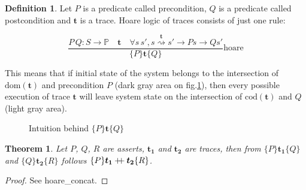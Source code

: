 \documentclass[10pt,letterpaper]{article}
\newcommand \prop{\mathds{P}}
\newcommand \dom[1]{\text{dom}\left(#1\right)}
\newcommand \cod[1]{\text{cod}\left(#1\right)}
\newcommand \chain[3]{\mathrel{#1\stackrel{#3}{\rightsquigarrow}#2}}
\newcommand \bm[1]{\boldsymbol{#1}}
\newcommand \mdoubleplus{\mathbin{+\mkern-6mu+}}
\newtheorem{theorem}{Theorem}
\theoremstyle{definition}
\newtheorem{definition}{Definition}
\begin{document}
\begin{definition}
  Let $P$ is a predicate called precondition, $Q$ is a predicate
  called postcondition and $\bm{t}$ is a trace. Hoare logic of traces
  consists of just one rule:

  \begin{equation}
    \frac{P\, Q: S \to \prop \quad \bm{t} \quad \forall s\,s', \chain{s}{s'}{\bm{t}} \to P s \to Q s'}
         {\{P\} \bm{t} \{Q\}}
    \text{hoare}
  \end{equation}

  This means that if initial state of the system belongs to the
  intersection of $\dom{\bm{t}}$ and precondition $P$ (dark gray area
  on fig.\ref{fig:hoare}), then every possible execution of trace
  $\bm{t}$ will leave system state on the intersection of
  $\cod{\bm{t}}$ and $Q$ (light gray area).

  \def\grdom{(0,0) circle (1.5cm)}
  \def\grcod{(0:5cm) circle (1.5cm)}
  \def\grpre{(1cm,2cm) circle (1.5cm)}
  \def\grpost{(6cm,2cm) circle (1.5cm)}

  \begin{figure}[h]
    \centering
    \caption{Intuition behind $\{P\}\bm{t}\{Q\}$}
    \label{fig:hoare}
  \end{figure}
\end{definition}

\begin{theorem}
  Let $P$, $Q$, $R$ are asserts, $\bm{t_1}$ and $\bm{t_2}$ are traces,
  then from $\{P\}\bm{t_1}\{Q\}$ and $\{Q\}\bm{t_2}\{R\}$ follows
  $\{P\}\bm{t_1} \mdoubleplus \bm{t_2} \{R\}$.
\end{theorem}
\begin{proof}
See \mbox{hoare\_concat}.
\end{proof}
\end{document}
